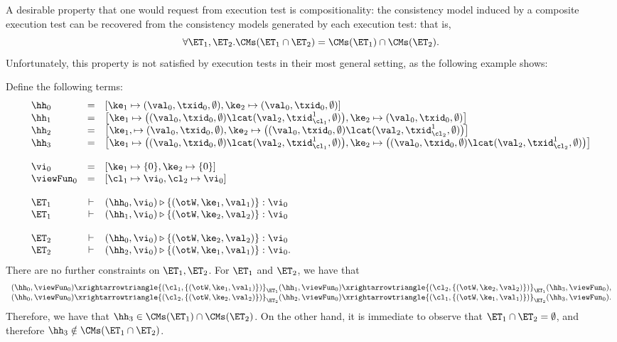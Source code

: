 A desirable property that one would request from execution 
test is compositionality: the consistency model induced by 
a composite execution test can be recovered from the consistency 
models generated by each execution test: that is, 
\[ 
\forall \ET_1, \ET_2. \CMs(\ET_1 \cap \ET_2) = \CMs(\ET_1) \cap \CMs(\ET_2).
\]
Unfortunately, this property is not satisfied by execution tests in their 
most general setting, as the following example shows: 
\begin{example}
\label{ex:noncompositional.et}
Define the following terms: 
\[
\begin{array}{lcl}
\hh_0 &=& [\ke_1 \mapsto (\val_0, \txid_0, \emptyset) , \ke_2 \mapsto (\val_0, \txid_0, \emptyset)]\\
\hh_1 &=& \big[\ke_1 \mapsto \big( (\val_0, \txid_0, \emptyset) \lcat (\val_2, \txid_{\cl_1}^{1}, \emptyset)\big) , \ke_2 \mapsto (\val_0, \txid_0, \emptyset) \big]\\
\hh_2 &=& \big[\ke_1, \mapsto (\val_0, \txid_0, \emptyset), \ke_2 \mapsto \big( (\val_0, \txid_0, \emptyset) \lcat (\val_2, \txid_{\cl_2}^{1}, \emptyset) \big) \big]\\
\hh_3 &=& \big[\ke_1 \mapsto \big( (\val_0, \txid_0, \emptyset) \lcat (\val_2, \txid_{\cl_1}^{1}, \emptyset)\big), 
                         \ke_2 \mapsto \big( (\val_0, \txid_0, \emptyset) \lcat (\val_2, \txid_{\cl_2}^{1}, \emptyset) \big) \big]\\
&&\\
\vi_0 &=& [\ke_1 \mapsto \{0\}, \ke_2 \mapsto \{0\}]\\
\viewFun_0 &=& [\cl_1 \mapsto \vi_0, \cl_2 \mapsto \vi_0]\\
&&\\
\ET_1 &\vdash& (\hh_0, \vi_0) \triangleright \{(\otW, \ke_1, \val_1)\} : \vi_0\\
\ET_1 &\vdash& (\hh_1, \vi_0) \triangleright \{(\otW, \ke_2, \val_2)\} : \vi_0\\
&&\\
\ET_2 &\vdash& (\hh_0, \vi_0) \triangleright \{(\otW, \ke_2, \val_2)\} : \vi_0\\
\ET_2 &\vdash& (\hh_2, \vi_0) \triangleright \{(\otW, \ke_1, \val_1)\} : \vi_0.
\end{array}
\]
There are no further constraints on $\ET_1, \ET_2$.
For $\ET_1$ and $\ET_2$, we have that 
\[
\begin{array}{l}
(\hh_0, \viewFun_0) \xrightarrowtriangle{(\cl_1, \{(\otW, \ke_1, \val_1)\})}_{\ET_1} 
(\hh_1, \viewFun_0) \xrightarrowtriangle{(\cl_2, \{(\otW, \ke_2, \val_2)\})}_{\ET_1} (\hh_3, \viewFun_0), \\
(\hh_0, \viewFun_0) \xrightarrowtriangle{(\cl_2, \{(\otW, \ke_2, \val_2)\})}_{\ET_2} 
(\hh_2, \viewFun_0) \xrightarrowtriangle{(\cl_1, \{(\otW, \ke_1, \val_1)\})}_{\ET_2} (\hh_3, \viewFun_0).\\
\end{array}
\] 
Therefore, we have that $\hh_3 \in \CMs(\ET_1) \cap \CMs(\ET_2)$. On the other hand, it is immediate 
to observe that $\ET_1 \cap \ET_2 = \emptyset$, and therefore $\hh_3 \notin \CMs(\ET_1 \cap \ET_2)$.
\end{example}
